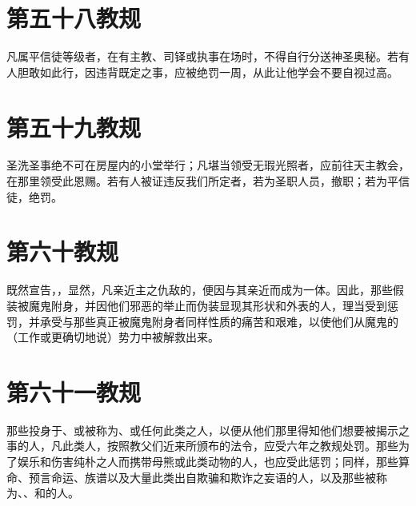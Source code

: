 \section{第五十八教规}

凡属平信徒等级者，在有主教、司铎或执事在场时，不得自行分送神圣奥秘。若有人胆敢如此行，因违背既定之事，应被绝罚一周，从此让他学会不要自视过高。\par


\section{第五十九教规}

圣洗圣事绝不可在房屋内的小堂举行；凡堪当领受无瑕光照者，应前往天主教会，在那里领受此恩赐。若有人被证违反我们所定者，若为圣职人员，撤职；若为平信徒，绝罚。\par


\section{第六十教规}

既然宣告，，显然，凡亲近主之仇敌的，便因与其亲近而成为一体。因此，那些假装被魔鬼附身，并因他们邪恶的举止而伪装显现其形状和外表的人，理当受到惩罚，并承受与那些真正被魔鬼附身者同样性质的痛苦和艰难，以使他们从魔鬼的（工作或更确切地说）势力中被解救出来。\par


\section{第六十一教规}

那些投身于、或被称为、或任何此类之人，以便从他们那里得知他们想要被揭示之事的人，凡此类人，按照教父们近来所颁布的法令，应受六年之教规处罚。那些为了娱乐和伤害纯朴之人而携带母熊或此类动物的人，也应受此惩罚；同样，那些算命、预言命运、族谱以及大量此类出自欺骗和欺诈之妄语的人，以及那些被称为、、和的人。\par

